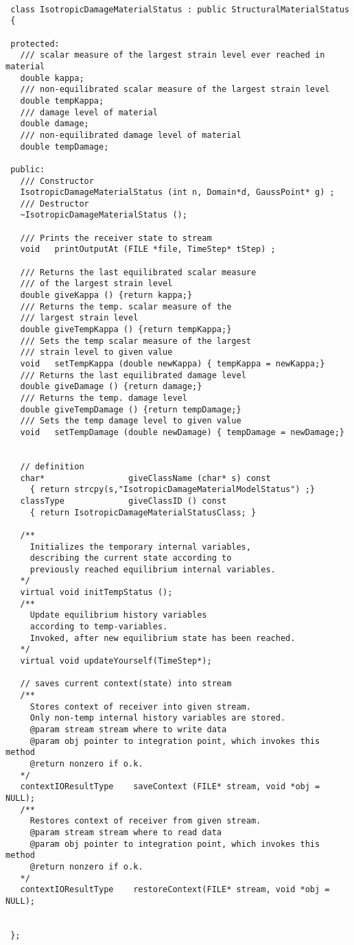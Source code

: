 \documentclass[12pt,draft]{article}
\begin{document}
 {
 \small
 \begin{verbatim}

 class IsotropicDamageMaterialStatus : public StructuralMaterialStatus
 {

 protected:
   /// scalar measure of the largest strain level ever reached in material
   double kappa;
   /// non-equilibrated scalar measure of the largest strain level
   double tempKappa;
   /// damage level of material
   double damage;
   /// non-equilibrated damage level of material
   double tempDamage;

 public: 
   /// Constructor
   IsotropicDamageMaterialStatus (int n, Domain*d, GaussPoint* g) ;
   /// Destructor
   ~IsotropicDamageMaterialStatus ();

   /// Prints the receiver state to stream
   void   printOutputAt (FILE *file, TimeStep* tStep) ;

   /// Returns the last equilibrated scalar measure 
   /// of the largest strain level
   double giveKappa () {return kappa;}
   /// Returns the temp. scalar measure of the 
   /// largest strain level
   double giveTempKappa () {return tempKappa;}
   /// Sets the temp scalar measure of the largest 
   /// strain level to given value
   void   setTempKappa (double newKappa) { tempKappa = newKappa;}
   /// Returns the last equilibrated damage level
   double giveDamage () {return damage;}
   /// Returns the temp. damage level
   double giveTempDamage () {return tempDamage;}
   /// Sets the temp damage level to given value
   void   setTempDamage (double newDamage) { tempDamage = newDamage;}


   // definition
   char*                 giveClassName (char* s) const
     { return strcpy(s,"IsotropicDamageMaterialModelStatus") ;}
   classType             giveClassID () const 
     { return IsotropicDamageMaterialStatusClass; }

   /**
     Initializes the temporary internal variables, 
     describing the current state according to 
     previously reached equilibrium internal variables.
   */
   virtual void initTempStatus ();
   /**
     Update equilibrium history variables 
     according to temp-variables.
     Invoked, after new equilibrium state has been reached.
   */
   virtual void updateYourself(TimeStep*); 

   // saves current context(state) into stream
   /**
     Stores context of receiver into given stream. 
     Only non-temp internal history variables are stored.
     @param stream stream where to write data
     @param obj pointer to integration point, which invokes this method
     @return nonzero if o.k.
   */
   contextIOResultType    saveContext (FILE* stream, void *obj = NULL);
   /**
     Restores context of receiver from given stream. 
     @param stream stream where to read data
     @param obj pointer to integration point, which invokes this method
     @return nonzero if o.k.
   */
   contextIOResultType    restoreContext(FILE* stream, void *obj = NULL);


 };  
 \end{verbatim}
 }
\end{document}
